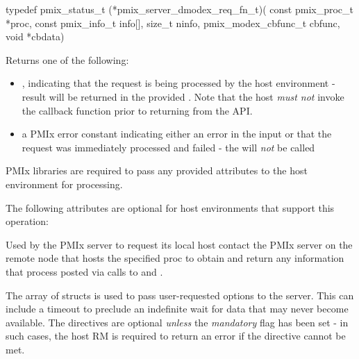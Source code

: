 \cspecificstart
\begin{codepar}
typedef pmix_status_t (*pmix_server_dmodex_req_fn_t)(
                             const pmix_proc_t *proc,
                             const pmix_info_t info[],
                             size_t ninfo,
                             pmix_modex_cbfunc_t cbfunc,
                             void *cbdata)
\end{codepar}
\cspecificend

\begin{arglist}
\end{arglist}

Returns one of the following:

\begin{itemize}
    \item {}, indicating that the request is being processed by the host environment - result will be returned in the provided . Note that the host \emph{must not} invoke the callback function prior to returning from the \ac{API}.
    \item a PMIx error constant indicating either an error in the input or that the request was immediately processed and failed - the  will \textit{not} be called
\end{itemize}

\reqattrstart
\ac{PMIx} libraries are required to pass any provided attributes to the host environment for processing.
\reqattrend

\optattrstart
The following attributes are optional for host environments that support this operation:


\optattrend

\descr

Used by the \ac{PMIx} server to request its local host contact the \ac{PMIx} server on the remote node that hosts the specified proc to obtain and return any information that process posted via calls to  and .

The array of  structs is used to pass user-requested options to the server.
This can include a timeout to preclude an indefinite wait for data that may never become available.
The directives are optional \emph{unless} the \emph{mandatory} flag has been set - in such cases, the host \ac{RM} is required to return an error if the directive cannot be met.


